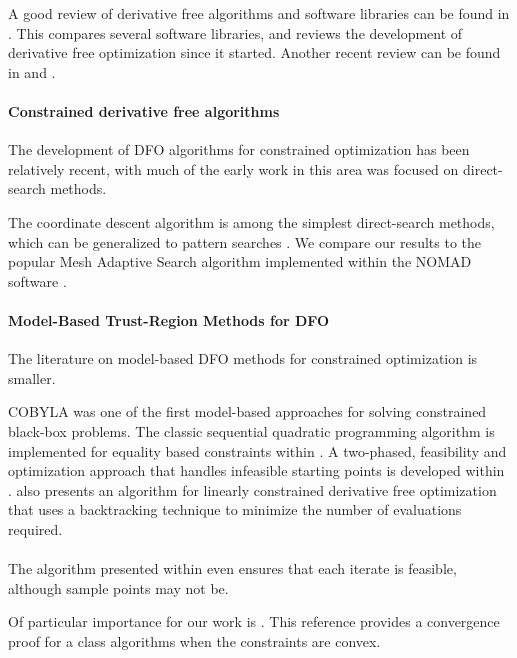 A good review of derivative free algorithms and software libraries can be found in \cite{miguel_review}.
This compares several software libraries, and reviews the development of derivative free optimization since it started.
Another recent review can be found in \cite{custodio_review2} and \cite{larson_menickelly_wild_2019}.


\paragraph*{Constrained derivative free algorithms}
The development of DFO algorithms for constrained optimization has been relatively recent,
with much of the early work in this area was focused on direct-search methods.

The coordinate descent algorithm is among the simplest direct-search methods, 
which can be generalized to pattern searches \cite{Audet2002AnalysisOG}. 
We compare our results to the popular Mesh Adaptive Search algorithm implemented within the NOMAD software
\cite{Le2011a}.

\paragraph*{Model-Based Trust-Region Methods for DFO}
The literature on model-based DFO methods for constrained optimization is smaller. 

COBYLA \cite{pub.1046127469} was one of the first model-based approaches for solving constrained black-box problems.
The classic sequential quadratic programming algorithm is implemented for equality based constraints within \cite{Troltzsch2016}.
A two-phased, feasibility and optimization approach that handles infeasible starting points is developed within \cite{BAJAJ2018306}.
\cite{Gao2018} also presents an algorithm for linearly constrained derivative free optimization that uses a backtracking technique to minimize the number of evaluations required.



\paragraph*{}
The algorithm presented within \cite{doi:10.1080/10556788.2015.1026968} even ensures that each iterate is feasible, 
although sample points may not be.

Of particular importance for our work is \cite{Conejo:2013:GCT:2620806.2621814}.
This reference provides a convergence proof for a class algorithms when the constraints are convex.


